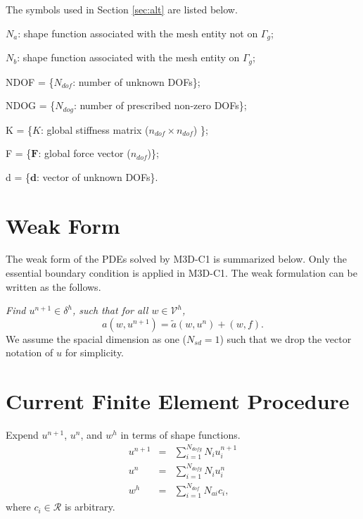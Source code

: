 \documentclass[11pt]{article}  %
\begin{document}
 The symbols used in Section \ref{sec:alt} are listed below.
 \begin{description}
 \item $N_a$: shape function associated with the mesh entity not on $\Gamma_g$;
 \item $N_b$: shape function associated with the mesh entity on $\Gamma_g$;
 \item NDOF = \{$N_{dof}$: number of unknown DOFs\};
 \item NDOG = \{$N_{dog}$: number of prescribed non-zero DOFs\};
 \item K = \{$K$: global stiffness matrix ($n_{dof} \times n_{dof}$) \};
 \item F = \{$\mathbf{F}$: global force vector ($n_{dof}$)\};
 \item d = \{$\mathbf{d}$: vector of unknown DOFs\}.
 \end{description}
\section{Weak Form} \label{sec:weakform}
The weak form of the PDEs  \cite{hughes2012finite} solved by M3D-C1 is summarized below. Only the essential  boundary condition is applied in M3D-C1. The  weak formulation can be written as the follows.
 
\textit{ Find $u^{n+1}\in \mathcal{\delta}^h$, such that for all $w \in \mathcal{V}^h$,}
\begin{equation}
a(w, u^{n+1}) = \tilde{a}(w, u^n) + (w,f). \label{eqn:weakform}
\end{equation}
We assume the spacial dimension as one ($N_{sd}=1$) such that we drop the vector notation of $u$ for simplicity. 

 \section{Current Finite Element Procedure} \label{sec:current}
Expend $u^{n+1}$, $u^n$, and $w^h$ in terms of shape functions.
\begin{eqnarray}
u^{n+1}&=&\sum_{i=1}^{N_{dofg}} N_{i} u_{i}^{n+1}\\
u^n &=&\sum_{i=1}^{N_{dofg}} N_{i} u_{i}^{n} \\
w^{h}&=&\sum_{i=1}^{N_{dof}} N_{ai} c_{i},
\end{eqnarray}
where $c_i\in \mathcal{R}$ is arbitrary.
\end{document}
